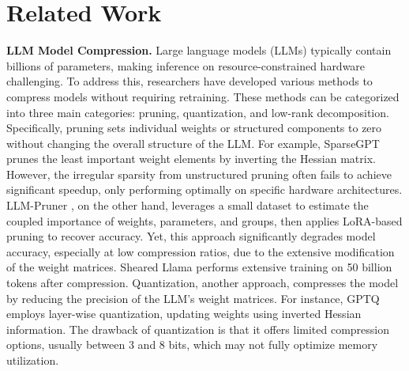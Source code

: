 \section{Related Work}
\label{sec_appn_relatedWork}
\textbf{LLM Model Compression.}
Large language models (LLMs) typically contain billions of parameters, making inference on resource-constrained hardware challenging. To address this, researchers have developed various methods to compress models without requiring retraining. These methods can be categorized into three main categories: pruning, quantization, and low-rank decomposition. Specifically, pruning sets individual weights or structured components to zero without changing the overall structure of the LLM. For example, SparseGPT \citep{sparsegpt} prunes the least important weight elements by inverting the Hessian matrix. However, the irregular sparsity from unstructured pruning often fails to achieve significant speedup, only performing optimally on specific hardware architectures. LLM-Pruner \citep{llmpruner}, on the other hand, leverages a small dataset to estimate the coupled importance of weights, parameters, and groups, then applies LoRA-based pruning to recover accuracy. Yet, this approach significantly degrades model accuracy, especially at low compression ratios, due to the extensive modification of the weight matrices.  Sheared Llama \citep{ShearedLlama} performs extensive training on 50 billion tokens after compression.
Quantization, another approach, compresses the model by reducing the precision of the LLM’s weight matrices. For instance, GPTQ \citep{gptq} employs layer-wise quantization, updating weights using inverted Hessian information. The drawback of quantization is that it offers limited compression options, usually between 3 and 8 bits, which may not fully optimize memory utilization.

